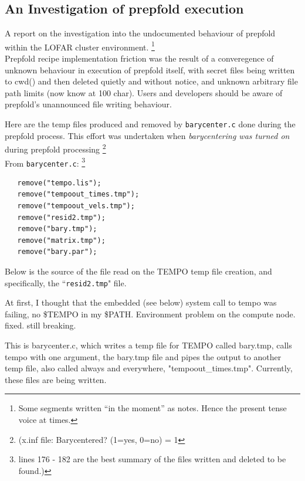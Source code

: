 \documentclass[a4paper,10pt,bibtotoc]{scrartcl}
\begin{document}
\subsection{An Investigation of prepfold execution}
A report on the investigation into the undocumented behaviour of
prepfold within the LOFAR cluster environment. \footnote{Some
  segments written ``in the moment'' as notes. Hence the present tense
  voice at times.}\\

Prepfold recipe implementation friction was the result
of a converegence of unknown behaviour in execution of prepfold
itself, with secret files being written to cwd() and then deleted
quietly and without notice, and unknown arbitrary file path limits
(now know at 100 char). Users and developers should be aware of
prepfold's unannounced file writing behaviour.

Here are the temp files produced and removed by 
\texttt{barycenter.c} done during the prepfold process.  This effort
was undertaken when \textit{barycentering was turned on} during 
prepfold processing \footnote{(x.inf file: Barycentered?           (1=yes, 0=no)  =  1}\\
From \texttt{barycenter.c}: \footnote{lines 176 - 182 are the best summary
  of the files written and deleted to be found.)}

\begin{verbatim}  
   remove("tempo.lis");
   remove("tempoout_times.tmp");
   remove("tempoout_vels.tmp");
   remove("resid2.tmp");
   remove("bary.tmp");
   remove("matrix.tmp");
   remove("bary.par");
\end{verbatim}

Below is the source of the file read on the TEMPO temp file creation,
and specifically, the ``\verb|resid2.tmp|" file.

At first, I thought that the embedded (see below) system call to tempo 
was failing, no \$TEMPO in my \$PATH.  Environment problem on the
compute node. fixed. still breaking.

This is barycenter.c, which writes a temp file for TEMPO called bary.tmp,
calls tempo with one argument, the bary.tmp file and pipes the output to
another temp file, also called always and everywhere, "tempoout\_times.tmp".
Currently, these files are being written.
\end{document}
